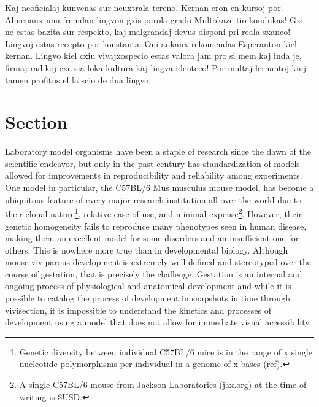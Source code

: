 


\vspace{0.2in}

Kaj neoficialaj kunvenas sur neuxtrala tereno. Kernan eron en kursoj por. Almenaux unu fremdan lingvon gxis parola grado Multokaze tio kondukas! Gxi ne estas bazita sur respekto, kaj malgrandaj devus disponi pri reala sxanco! Lingvoj estas recepto por konstanta. Oni ankaux rekomendas Esperanton kiel kernan. Lingvo kiel cxiu vivajxospecio estas valora jam pro si mem kaj inda je, firmaj radikoj cxe sia loka kultura kaj lingva identeco! Por multaj lernantoj kiuj tamen profitus el la scio de dua lingvo. 

\vspace{0.2in} 

\section{Section}

Laboratory model organisms have been a staple of research since the dawn of the scientific endeavor, but only in the past century has standardization of models allowed for improvements in reproducibility and reliability among experiments. One model in particular, the C57BL/6 Mus musculus mouse model, has become a ubiquitous feature of every major research institution all over the world due to their clonal nature\footnote{Genetic diversity between individual C57BL/6 mice is in the range of x single nucleotide polymorphisms per individual in a genome of x bases (ref).}, relative ease of use, and minimal expense\footnote{A single C57BL/6 mouse from Jackson Laboratories (jax.org) at the time of writing is \$USD.}. However, their genetic homogeneity fails to reproduce many phenotypes seen in human disease, making them an excellent model for some disorders and an insufficient one for others. This is nowhere more true than in developmental biology. Although mouse viviparous development is extremely well defined and stereotyped over the course of gestation, that is precisely the challenge. Gestation is an internal and ongoing process of physiological and anatomical development and while it is possible to catalog the process of development in snapshots in time through vivisection, it is impossible to understand the kinetics and processes of development using a model that does not allow for immediate visual accessibility. 


